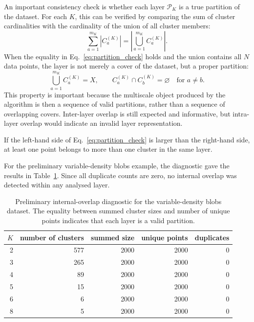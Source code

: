\documentclass[pdflatex,sn-mathphys-num]{sn-jnl}
\newcommand{\calP}{\mathcal{P}}
\begin{document}
An important consistency check is whether each layer $\calP_K$ is a true partition of the dataset. For each $K$, this can be verified by comparing the sum of cluster cardinalities with the cardinality of the union of all cluster members:
\begin{equation}
\sum_{a=1}^{m_K}|C_a^{(K)}|=\left|\bigcup_{a=1}^{m_K}C_a^{(K)}\right|.
\label{eq:partition_check}
\end{equation}
When the equality in Eq.~\eqref{eq:partition_check} holds and the union contains all $N$ data points, the layer is not merely a cover of the dataset, but a proper partition:
\begin{equation}
\bigcup_{a=1}^{m_K} C_a^{(K)}=X,
\qquad
C_a^{(K)}\cap C_b^{(K)}=\varnothing
\quad\text{for }a\neq b.
\end{equation}
This property is important because the multiscale object produced by the algorithm is then a sequence of valid partitions, rather than a sequence of overlapping covers. Inter-layer overlap is still expected and informative, but intra-layer overlap would indicate an invalid layer representation.

If the left-hand side of Eq.~\eqref{eq:partition_check} is larger than the right-hand side, at least one point belongs to more than one cluster in the same layer.

For the preliminary variable-density blobs example, the diagnostic gave the results in Table~\ref{tab:partition_diagnostic}. Since all duplicate counts are zero, no internal overlap was detected within any analysed layer.

\begin{table}[t]
\caption{Preliminary internal-overlap diagnostic for the variable-density blobs dataset. The equality between summed cluster sizes and number of unique points indicates that each layer is a valid partition.}\label{tab:partition_diagnostic}
\centering
\begin{tabular}{rrrrr}
\toprule
$K$ & number of clusters & summed size & unique points & duplicates\\
\midrule
2 & 577 & 2000 & 2000 & 0\\
3 & 265 & 2000 & 2000 & 0\\
4 & 89  & 2000 & 2000 & 0\\
5 & 15  & 2000 & 2000 & 0\\
6 & 6   & 2000 & 2000 & 0\\
8 & 5   & 2000 & 2000 & 0\\
\bottomrule
\end{tabular}
\end{table}
\end{document}
